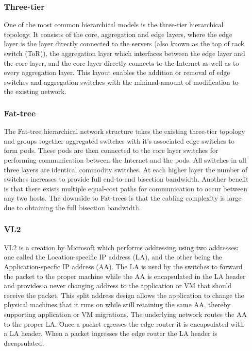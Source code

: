 \documentclass[fullapage,12pt]{article}
\begin{document}
\subsubsection{Three-tier} \label{subp:three-tier}

One of the most common hierarchical models is the three-tier hierarchical topology. It consists of the core, aggregation and edge layers, where the edge layer is the layer directly connected to the servers (also known as the top of rack switch (ToR)), the aggregation layer which interfaces between the edge layer and the core layer, and the core layer directly connects to the Internet as well as to every aggregation layer. This layout enables the addition or removal of edge switches and aggregation switches with the minimal amount of modification to the existing network.

\subsubsection{Fat-tree} \label{subp:fat-tree}

The Fat-tree hierarchical network structure takes the existing three-tier topology and groups together aggregated switches with it's associated edge switches to form pods. These pods are then connected to the core layer switches for performing communication between the Internet and the pods. All switches in all three layers are identical commodity switches. At each higher layer the number of switches increases to provide full end-to-end bisection bandwidth. Another benefit is that there exists multiple equal-cost paths for communication to occur between any two hosts. The downside to Fat-trees is that the cabling complexity is large due to obtaining the full bisection bandwidth.

\subsubsection{VL2} \label{subp:vl2}

VL2 is a creation by Microsoft which performs addressing using two addresses: one called the Location-specific IP address (LA), and the other being the Application-specfic IP address (AA). The LA is used by the switches to forward the packet to the proper machine while the AA is encapsulated in the LA header and provides a never changing address to the application or VM that should receive the packet. This split address design allows the application to change the physical machines that it runs on while still retaining the same AA, thereby supporting application or VM migrations. The underlying network routes the AA to the proper LA. Once a packet egresses the edge router it is encapsulated with a LA header. When a packet ingresses the edge router the LA header is decapsulated.
\end{document}
